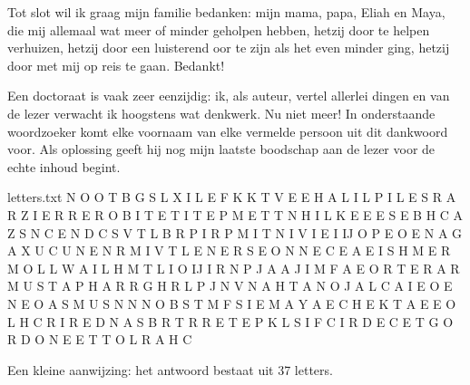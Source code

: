 \documentclass[main]{subfiles}
\begin{document}
Tot slot wil ik graag mijn familie bedanken: mijn mama, papa, Eliah en Maya, die mij allemaal wat meer of minder geholpen hebben, hetzij door te helpen verhuizen, hetzij door een luisterend oor te zijn als het even minder ging, hetzij door met mij op reis te gaan.
Bedankt!

Een doctoraat is vaak zeer eenzijdig: ik, als auteur, vertel allerlei dingen en van de lezer verwacht ik hoogstens wat denkwerk.
Nu niet meer!
In onderstaande woordzoeker komt elke voornaam van elke vermelde persoon uit dit dankwoord voor.
Als oplossing geeft hij nog mijn laatste boodschap aan de lezer voor de echte inhoud begint.


\begin{filecontents*}{letters.txt}
N O O T B G S L X I L E F K K T V
E E H A L I L P I L E S R A R Z I
E R R E R O B I T E T I T E P M E
T T N H I L K E E E S E B H C A Z
S N C E N D C S V T L B R P I R P
M I T N I V I E I IJ O P E O E N A
G A X U C U N E N R M I V T L E N
E R S E O N N E C E A E I S H M E
R M O L L W A I L H M T L I O IJ I
R N P J A A J I M F A E O R T E R
A R M U S T A P H A R R G H R L P
J N V N A H T A N O J A L C A I E
O E N E O A S M U S N N N O B S T
M F S I E M A Y A E C H E K T A E
E O L H C R I R E D N A S B R T R
R E T E P K L S I F C I R D E C E
T G O R D O N E E T T O L R A H C
\end{filecontents*}

\readarray*{}

\vspace{\fill}

\begin{wide}
\end{wide}

{\small Een kleine aanwijzing: het antwoord bestaat uit 37 letters.}



\end{document}
